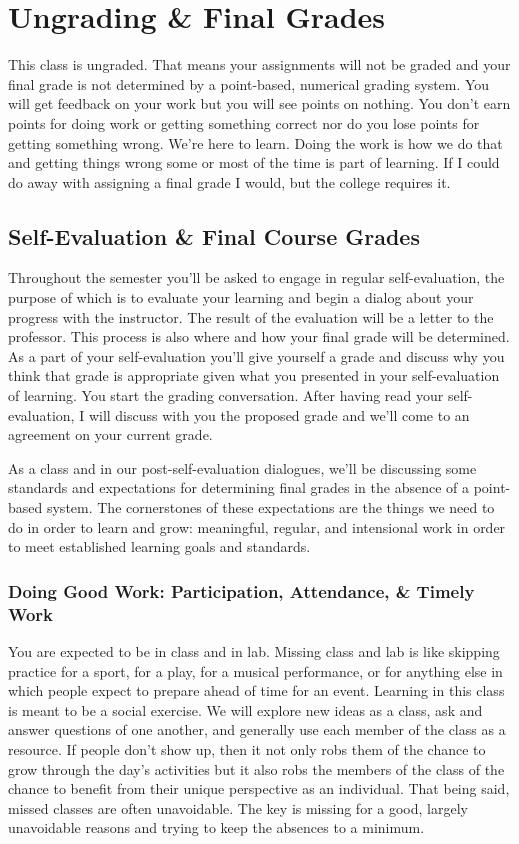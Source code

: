 \documentclass[10pt]{article}
\begin{document}
\section{Ungrading \& Final Grades}

This class is ungraded. That means your assignments will not be graded and your final grade is not determined by a point-based, numerical grading system. You will get feedback on your work but you will see points on nothing. You don't earn points for doing work or getting something correct nor do you lose points for getting something wrong. We're here to learn. Doing the work is how we do that and getting things wrong some or most of the time is part of learning. If I could do away with assigning a final grade I would, but the college requires it.

\subsection{Self-Evaluation \& Final Course Grades}

Throughout the semester you'll be asked to engage in regular self-evaluation, the purpose of which is to evaluate your learning and begin a dialog about your progress with the instructor. The result of the evaluation will be a letter to the professor. This process is also where and how your final grade will be determined. As a part of your self-evaluation you'll give yourself a grade and discuss why you think that grade is appropriate given what you presented in your self-evaluation of learning. You start the grading conversation. After having read your self-evaluation, I will discuss with you the proposed grade and we'll come to an agreement on your current grade.

As a class and in our post-self-evaluation dialogues, we'll be discussing some standards and expectations for determining final grades in the absence of a point-based system. The cornerstones of these expectations are the things we need to do in order to learn and grow: meaningful, regular, and intensional work in order to meet established learning goals and standards.


\subsubsection{Doing Good Work: Participation, Attendance, \& Timely Work}

You are expected to be in class and in lab. Missing class and lab is like skipping practice for a sport, for a play, for a musical performance, or for anything else in which people expect to prepare ahead of time for an event. Learning in this class is meant to be a social exercise. We will explore new ideas as a class, ask and answer questions of one another, and generally use each member of the class as a resource. If people don't show up, then it not only robs them of the chance to grow through the day's activities but it also robs the members of the class of the chance to benefit from their unique perspective as an individual. That being said, missed classes are often unavoidable. The key is missing for a good, largely unavoidable reasons and trying to keep the absences to a minimum.
\end{document}
